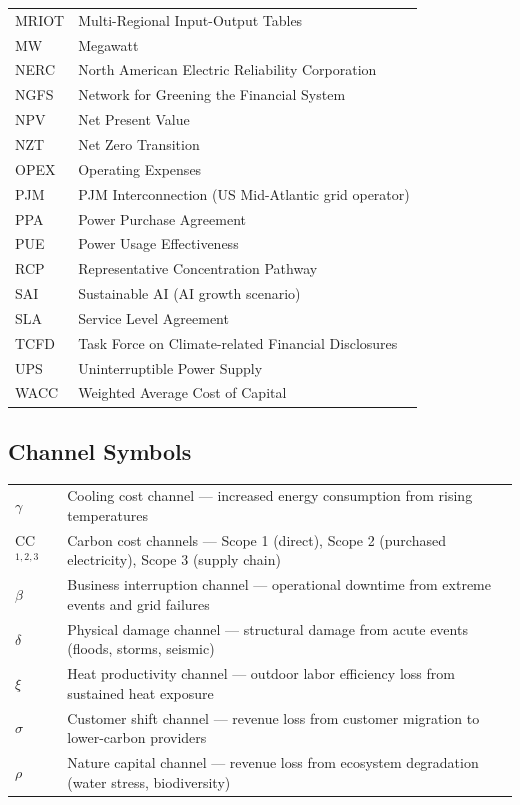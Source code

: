 \begin{tabular}{@{}p{3cm}p{11cm}@{}}
MRIOT & Multi-Regional Input-Output Tables \\
MW & Megawatt \\
NERC & North American Electric Reliability Corporation \\
NGFS & Network for Greening the Financial System \\
NPV & Net Present Value \\
NZT & Net Zero Transition \\
OPEX & Operating Expenses \\
PJM & PJM Interconnection (US Mid-Atlantic grid operator) \\
PPA & Power Purchase Agreement \\
PUE & Power Usage Effectiveness \\
RCP & Representative Concentration Pathway \\
SAI & Sustainable AI (AI growth scenario) \\
SLA & Service Level Agreement \\
TCFD & Task Force on Climate-related Financial Disclosures \\
UPS & Uninterruptible Power Supply \\
WACC & Weighted Average Cost of Capital \\
\end{tabular}

\subsection*{Channel Symbols}

\begin{tabular}{@{}p{3cm}p{11cm}@{}}
$\gamma$ & Cooling cost channel --- increased energy consumption from rising temperatures \\
CC$^{1,2,3}$ & Carbon cost channels --- Scope 1 (direct), Scope 2 (purchased electricity), Scope 3 (supply chain) \\
$\beta$ & Business interruption channel --- operational downtime from extreme events and grid failures \\
$\delta$ & Physical damage channel --- structural damage from acute events (floods, storms, seismic) \\
$\xi$ & Heat productivity channel --- outdoor labor efficiency loss from sustained heat exposure \\
$\sigma$ & Customer shift channel --- revenue loss from customer migration to lower-carbon providers \\
$\rho$ & Nature capital channel --- revenue loss from ecosystem degradation (water stress, biodiversity) \\
\end{tabular}

